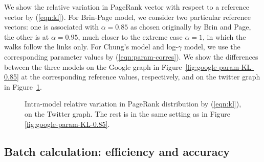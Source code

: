 \documentclass[conference]{IEEEtran}
\begin{document}

We show the relative variation in PageRank vector with respect to a
reference vector by (\ref{eqn:kl}).  For Brin-Page model, we consider
two particular reference vectors: one is associated with $\alpha=0.85$
as chosen originally by Brin and Page, the other is at $\alpha = 0.95$,
much closer to the extreme case $\alpha=1$, in which the walks follow
the links only.  For Chung's model and log-$\gamma$ model, we use the corresponding parameter
values by (\ref{eqn:param-corres}).
%
We show the differences between the three models on the Google graph in
Figure~\ref{fig:google-param-KL-0.85} at the corresponding reference values, 
respectively, and on the twitter graph in
Figure~\ref{fig:twitter-param-KL-0.85}.

\begin{figure}[!htb]
  \centering
  \caption{\footnotesize Intra-model relative variation in PageRank
    distribution by (\ref{eqn:kl}), on the Twitter graph. The rest is in the same setting as in Figure \ref{fig:google-param-KL-0.85}.}
%
\label{fig:twitter-param-KL-0.85}
\end{figure}


%




 
%



\subsection{Batch calculation: efficiency and accuracy} 
\label{subsec:batch-calculation} 
% 
%
\end{document}
